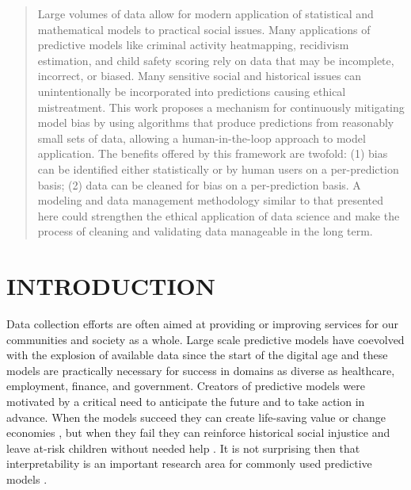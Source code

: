 \documentclass[conference]{IEEEtran}
\begin{document}
\begin{abstract}
Large volumes of data allow for modern application of statistical and mathematical models to practical social issues. Many applications of predictive models like criminal activity heatmapping, recidivism estimation, and child safety scoring rely on data that may be incomplete, incorrect, or biased. Many sensitive social and historical issues can unintentionally be incorporated into predictions causing ethical mistreatment. This work proposes a mechanism for continuously mitigating model bias by using algorithms that produce predictions from reasonably small sets of data, allowing a human-in-the-loop approach to model application. The benefits offered by this framework are twofold: (1) bias can be identified either statistically or by human users on a per-prediction basis; (2) data can be cleaned for bias on a per-prediction basis. A modeling and data management methodology similar to that presented here could strengthen the ethical application of data science and make the process of cleaning and validating data manageable in the long term.
\end{abstract}
 


\section{INTRODUCTION}
\label{sec:introduction}
Data collection efforts are often aimed at providing or improving services for our communities and society as a whole. Large scale predictive models have coevolved with the explosion of available data since the start of the digital age and these models are practically necessary for success in domains as diverse as healthcare, employment, finance, and government. Creators of predictive models were motivated by a critical need to anticipate the future and to take action in advance. When the models succeed they can create life-saving value \cite{tomavsev2019clinically} or change economies \cite{siegel2016predictive}, but when they fail they can reinforce historical social injustice \cite{angwinmachine} and leave at-risk children without needed help \cite{eubanks2018child}. It is not surprising then that interpretability is an important research area for commonly used predictive models \cite{vellido2012making,doshi2018considerations,du2018techniques}.
\end{document}

